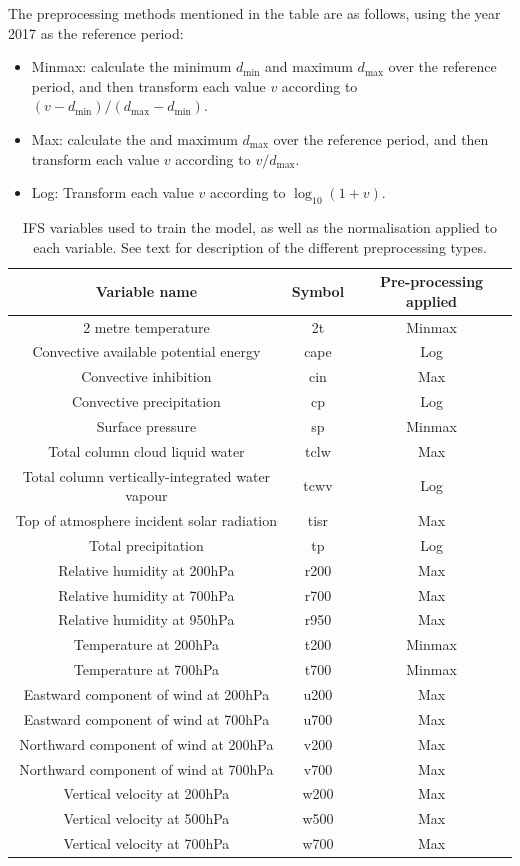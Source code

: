 \documentclass{article}
\begin{document}
The preprocessing methods mentioned in the table are as follows, using the year 2017 as the reference period:
\begin{itemize}
    \item Minmax: calculate the minimum $d_{\text{min}}$ and maximum $d_{\text{max}}$ over the reference period, and then transform each value $v$ according to $(v - d_{\text{min}}) / (d_{\text{max}} - d_{\text{min}})$.
    \item Max: calculate the and maximum $d_{\text{max}}$ over the reference period, and then transform each value $v$ according to $v  / d_{\text{max}}$.
    \item Log: Transform each value $v$ according to $\log_{10}(1+v)$.
\end{itemize}
\begin{table}[ht!]
\centering
\begin{tabular}{c | c | c } 
 \hline
 Variable name & Symbol & Pre-processing applied \\ [0.5ex] 
 \hline\hline
 2 metre temperature &2t & Minmax  \\
 Convective available potential energy &cape & Log \\
 Convective inhibition &cin & Max \\
Convective precipitation &cp & Log \\
Surface pressure & sp & Minmax  \\
Total column cloud liquid water &tclw & Max \\
Total column vertically-integrated water vapour&tcwv & Log \\
Top of atmosphere incident solar radiation&tisr & Max \\
Total precipitation &tp & Log \\
Relative humidity at 200hPa  &r200 & Max \\
Relative humidity at 700hPa  &r700 & Max \\
Relative humidity at 950hPa  &r950 & Max \\
Temperature at 200hPa &t200 & Minmax \\
Temperature at 700hPa  &t700 & Minmax \\
Eastward component of wind at 200hPa &u200 & Max \\
Eastward component of wind at 700hPa &u700 & Max \\
Northward component of wind at 200hPa&v200 & Max \\
Northward component of wind at 700hPa &v700 & Max \\
Vertical velocity at 200hPa &w200 & Max \\
Vertical velocity at 500hPa &w500 & Max \\
Vertical velocity at 700hPa &w700 & Max \\
 \hline
\end{tabular}

\caption{IFS variables used to train the model, as well as the normalisation applied to each variable. See text for description of the different preprocessing types.}
\label{tab:vars}
\end{table}
\end{document}
